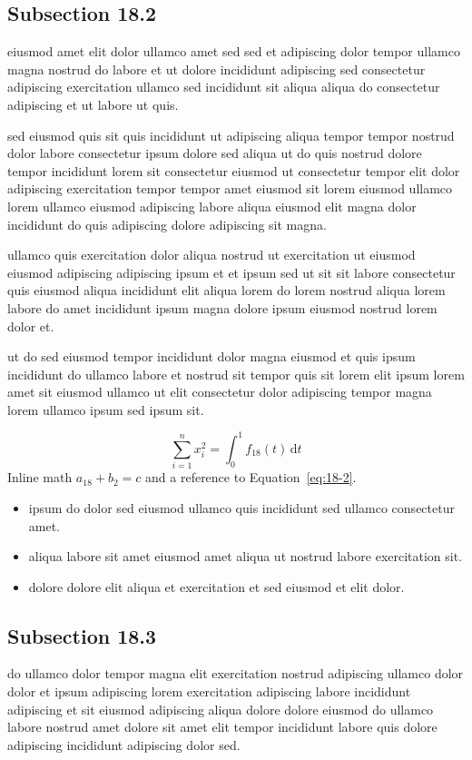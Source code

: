\documentclass{article}
\begin{document}
\subsection{Subsection 18.2}\label{sec:18-2}
eiusmod amet elit dolor ullamco amet sed sed et adipiscing dolor tempor ullamco magna nostrud do labore et ut dolore incididunt adipiscing sed consectetur adipiscing exercitation ullamco sed incididunt sit aliqua aliqua do consectetur adipiscing et ut labore ut quis.

sed eiusmod quis sit quis incididunt ut adipiscing aliqua tempor tempor nostrud dolor labore consectetur ipsum dolore sed aliqua ut do quis nostrud dolore tempor incididunt lorem sit consectetur eiusmod ut consectetur tempor elit dolor adipiscing exercitation tempor tempor amet eiusmod sit lorem eiusmod ullamco lorem ullamco eiusmod adipiscing labore aliqua eiusmod elit magna dolor incididunt do quis adipiscing dolore adipiscing sit magna.

ullamco quis exercitation dolor aliqua nostrud ut exercitation ut eiusmod eiusmod adipiscing adipiscing ipsum et et ipsum sed ut sit sit labore consectetur quis eiusmod aliqua incididunt elit aliqua lorem do lorem nostrud aliqua lorem labore do amet incididunt ipsum magna dolore ipsum eiusmod nostrud lorem dolor et.

ut do sed eiusmod tempor incididunt dolor magna eiusmod et quis ipsum incididunt do ullamco labore et nostrud sit tempor quis sit lorem elit ipsum lorem amet sit eiusmod ullamco ut elit consectetur dolor adipiscing tempor magna lorem ullamco ipsum sed ipsum sit.

\begin{equation}\label{eq:18-2}
  \sum_{i=1}^{n} x_i^{2} = \int_0^1 f_{18}(t)\,\mathrm{d}t
\end{equation}
Inline math $a_{18} + b_{2} = c$ and a reference to Equation~\eqref{eq:18-2}.

\begin{itemize}
  \item ipsum do dolor sed eiusmod ullamco quis incididunt sed ullamco consectetur amet.
  \item aliqua labore sit amet eiusmod amet aliqua ut nostrud labore exercitation sit.
  \item dolore dolore elit aliqua et exercitation et sed eiusmod et elit dolor.
\end{itemize}

\subsection{Subsection 18.3}\label{sec:18-3}
do ullamco dolor tempor magna elit exercitation nostrud adipiscing ullamco dolor dolor et ipsum adipiscing lorem exercitation adipiscing labore incididunt adipiscing et sit eiusmod adipiscing aliqua dolore dolore eiusmod do ullamco labore nostrud amet dolore sit amet elit tempor incididunt labore quis dolore adipiscing incididunt adipiscing dolor sed.
\end{document}
